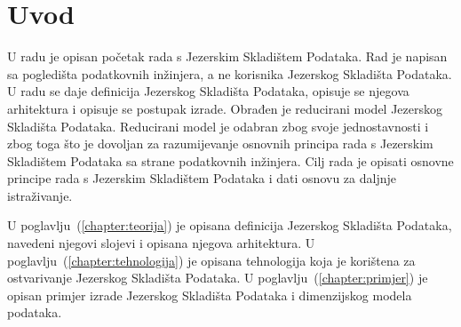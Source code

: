 \chapter{Uvod}

U radu je opisan početak rada s Jezerskim Skladištem Podataka. Rad je napisan sa
pogledišta podatkovnih inžinjera, a ne korisnika Jezerskog Skladišta Podataka. U
radu se daje definicija Jezerskog Skladišta Podataka, opisuje se njegova
arhitektura i opisuje se postupak izrade. Obrađen je reducirani model Jezerskog
Skladišta Podataka. Reducirani model je odabran zbog svoje jednostavnosti i zbog
toga što je dovoljan za razumijevanje osnovnih principa rada s Jezerskim
Skladištem Podataka sa strane podatkovnih inžinjera. Cilj rada je opisati
osnovne principe rada s Jezerskim Skladištem Podataka i dati osnovu za daljnje
istraživanje.

U poglavlju~(\ref{chapter:teorija}) je opisana definicija Jezerskog Skladišta
Podataka, navedeni njegovi slojevi i opisana njegova arhitektura. U
poglavlju~(\ref{chapter:tehnologija}) je opisana tehnologija koja je korištena
za ostvarivanje Jezerskog Skladišta Podataka. U
poglavlju~(\ref{chapter:primjer}) je opisan primjer izrade Jezerskog Skladišta
Podataka i dimenzijskog modela podataka.
